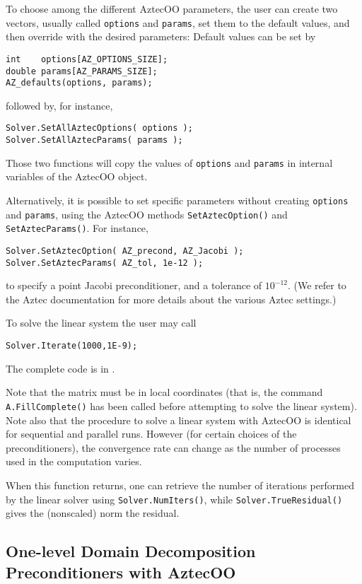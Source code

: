 To choose among the different AztecOO parameters, the user can create
two vectors, usually called \verb!options! and \verb!params!, set them
to the default values, and then override with the desired parameters:
Default values can be set by
\begin{verbatim}
int    options[AZ_OPTIONS_SIZE];
double params[AZ_PARAMS_SIZE];
AZ_defaults(options, params);
\end{verbatim}
followed by, for instance,
\begin{verbatim}
Solver.SetAllAztecOptions( options );
Solver.SetAllAztecParams( params );
\end{verbatim}
Those two functions will copy the values of \verb!options! and
\verb!params! in internal variables of the AztecOO object.

Alternatively, it is possible to set specific parameters without
creating \verb!options! and \verb!params!, using the AztecOO methods
\verb!SetAztecOption()! and \verb!SetAztecParams()!. 
For instance,
\begin{verbatim}
Solver.SetAztecOption( AZ_precond, AZ_Jacobi );
Solver.SetAztecParams( AZ_tol, 1e-12 );
\end{verbatim}
to specify a point Jacobi preconditioner, and a tolerance of $10^{-12}$.
(We refer to the Aztec documentation for more details about the various
Aztec settings.)

To solve the linear system the user may call
\begin{verbatim}
Solver.Iterate(1000,1E-9);
\end{verbatim}
The complete code is in .

Note that the matrix must be in local coordinates (that is, the command
\verb!A.FillComplete()! has been called before attempting to solve
the linear system).  Note also that the procedure to solve a linear
system with AztecOO is identical for sequential and parallel runs.
However (for certain choices of the preconditioners), the convergence
rate can change as the number of processes used in the computation
varies.

When this function returns, one can retrieve the number of iterations
performed by the linear solver using \verb!Solver.NumIters()!, while
\verb!Solver.TrueResidual()! gives the (nonscaled) norm the residual.



\subsection{One-level Domain Decomposition Preconditioners with AztecOO}
\label{sec:aztecoo_dd}

